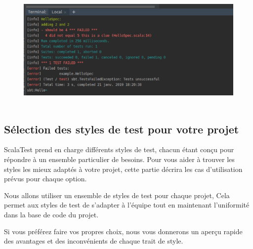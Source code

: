 \documentclass[12pt]{article}
\begin{document}
\par




\begin{figure}[H]
	\begin{Center}
		\includegraphics[width=5.37in,height=2.34in]{./media/image21.png}
	\end{Center}
\end{figure}



\par

\subsection{Sélection des styles de test pour votre projet}

\begin{justify}
ScalaTest prend en charge différents styles de test, chacun étant conçu pour répondre à un ensemble particulier de besoins. Pour vous aider à trouver les styles les mieux adaptés à votre projet, cette partie décrira les cas d'utilisation prévus pour chaque option.
\end{justify}\par

\begin{justify}
Nous allons utiliser un ensemble de styles de test pour chaque projet, Cela permet aux styles de test de s’adapter à l’équipe tout en maintenant l’uniformité dans la base de code du projet.
\end{justify}\par

\begin{justify}
Si vous préférez faire vos propres choix, nous vous donnerons un aperçu rapide des avantages et des inconvénients de chaque trait de style.
\end{justify}\par
\end{document}
